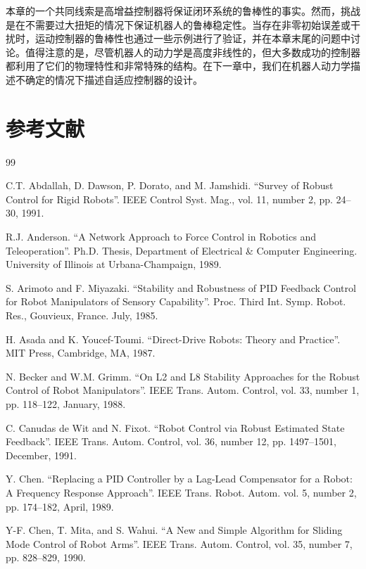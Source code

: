 \documentclass[UTF8,12pt,a4paper]{ctexart}
\begin{document}
本章的一个共同线索是高增益控制器将保证闭环系统的鲁棒性的事实。然而，挑战是在不需要过大扭矩的情况下保证机器人的鲁棒稳定性。当存在非零初始误差或干扰时，运动控制器的鲁棒性也通过一些示例进行了验证，并在本章末尾的问题中讨论。值得注意的是，尽管机器人的动力学是高度非线性的，但大多数成功的控制器都利用了它们的物理特性和非常特殊的结构。在下一章中，我们在机器人动力学描述不确定的情况下描述自适应控制器的设计。

\section*{参考文献}

\begin{thebibliography}{99}

C.T. Abdallah, D. Dawson, P. Dorato, and M. Jamshidi.
``Survey of Robust Control for Rigid Robots''. IEEE Control Syst. Mag., vol. 11, number 2, pp. 24--30, 1991.

R.J. Anderson.
``A Network Approach to Force Control in Robotics and Teleoperation''. Ph.D. Thesis, Department of Electrical \& Computer Engineering. University of Illinois at Urbana-Champaign, 1989.

S. Arimoto and F. Miyazaki.
``Stability and Robustness of PID Feedback Control for Robot Manipulators of Sensory Capability''. Proc. Third Int. Symp. Robot. Res., Gouvieux, France. July, 1985.

H. Asada and K. Youcef-Toumi.
``Direct-Drive Robots: Theory and Practice''. MIT Press, Cambridge, MA, 1987.

N. Becker and W.M. Grimm.
``On L2 and L8 Stability Approaches for the Robust Control of Robot Manipulators''. IEEE Trans. Autom. Control, vol. 33, number 1, pp. 118--122, January, 1988.

C. Canudas de Wit and N. Fixot.
``Robot Control via Robust Estimated State Feedback''. IEEE Trans. Autom. Control, vol. 36, number 12, pp. 1497--1501, December, 1991.

Y. Chen.
``Replacing a PID Controller by a Lag-Lead Compensator for a Robot: A Frequency Response Approach''. IEEE Trans. Robot. Autom. vol. 5, number 2, pp. 174--182, April, 1989.

Y-F. Chen, T. Mita, and S. Wahui.
``A New and Simple Algorithm for Sliding Mode Control of Robot Arms''. IEEE Trans. Autom. Control, vol. 35, number 7, pp. 828--829, 1990.


\end{thebibliography}
\end{document}
